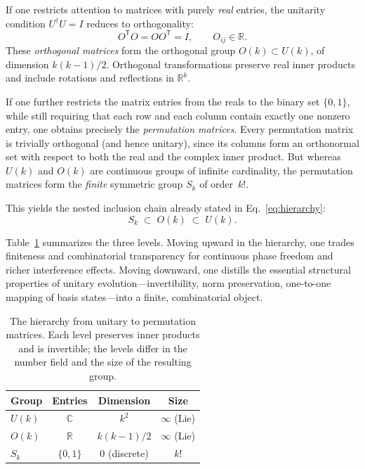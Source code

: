 \documentclass[
  twocolumn,
  aps,
  pra,
  showkeys,
  amsmath,amssymb,
  longbibliography
]{revtex4-2}
\begin{document}
If one restricts attention to matrices with purely \emph{real}
entries, the unitarity condition $U^\dagger U=I$ reduces to
orthogonality:
\begin{equation}
O^{\mathsf T} O = O O^{\mathsf T} = I,
\qquad O_{ij}\in\mathbb{R}.
\label{eq:orthogonal}
\end{equation}
These \emph{orthogonal matrices} form the orthogonal group
$O(k)\subset U(k)$, of dimension $k(k-1)/2$.
Orthogonal transformations preserve real inner products and
include rotations and reflections in $\mathbb{R}^k$.

If one further restricts the matrix entries from the reals to
the binary set $\{0,1\}$, while still requiring that each row
and each column contain exactly one nonzero entry, one obtains
precisely the \emph{permutation matrices}.
Every permutation matrix is trivially orthogonal (and hence
unitary), since its columns form an orthonormal set with
respect to both the real and the complex inner product.
But whereas $U(k)$ and $O(k)$ are continuous groups of
infinite cardinality, the permutation matrices form the
\emph{finite} symmetric group $S_k$ of order~$k!$.

This yields the nested inclusion chain already stated in
Eq.~\eqref{eq:hierarchy}:
\begin{equation}
S_k \;\subset\; O(k) \;\subset\; U(k).
\label{eq:hierarchy2}
\end{equation}

Table~\ref{tab:hierarchy} summarizes the three levels.
Moving upward in the hierarchy, one trades finiteness and
combinatorial transparency for continuous phase freedom and
richer interference effects.
Moving downward, one distills the essential structural
properties of unitary evolution---invertibility, norm
preservation, one-to-one mapping of basis
states---into a finite, combinatorial object.

\begin{table}[b]
\caption{The hierarchy from unitary to permutation matrices.
Each level preserves inner products and is invertible;
the levels differ in the number field and the size of the
resulting group.}
\label{tab:hierarchy}
\begin{ruledtabular}
\begin{tabular}{lccc}
Group & Entries & Dimension & Size \\
\hline
$U(k)$ & $\mathbb{C}$   & $k^2$ & $\infty$ (Lie) \\
$O(k)$ & $\mathbb{R}$   & $k(k{-}1)/2$ & $\infty$ (Lie) \\
$S_k$  & $\{0,1\}$      & $0$ (discrete) & $k!$ \\
\end{tabular}
\end{ruledtabular}
\end{table}
\end{document}
